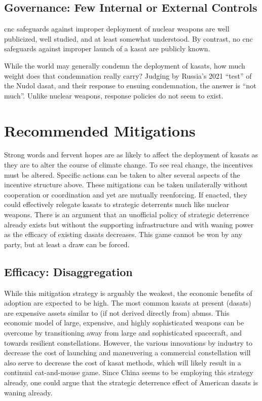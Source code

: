 \subsection*{Governance: Few Internal or External Controls}

\ac{cnc} safeguards against improper deployment of nuclear weapons are
well publicized, well studied, and at least somewhat
understood.\cite{nuke-matters-handbook} By contrast, no \ac{cnc}
safeguards against improper launch of a \ac{kasat} are publicly known.

While the world may generally condemn the deployment of \acp{kasat},
how much weight does that condemnation really carry?  Judging by
Russia's 2021 ``test'' of the Nudol \ac{dasat}, and their response to
ensuing condemnation, the answer is ``not much''.  Unlike nuclear
weapons, response policies do not seem to exist.


\section*{Recommended Mitigations}

Strong words and fervent hopes are as likely to affect the deployment
of \acp{kasat} as they are to alter the course of climate change.  To
see real change, the incentives must be altered.  Specific actions can
be taken to alter several aspects of the incentive structure above.
These mitigations can be taken unilaterally without cooperation or
coordination and yet are mutually reenforcing.  If enacted, they could
effectively relegate \acp{kasat} to strategic deterrents much like
nuclear weapons.  There is an argument that an unofficial policy of
strategic deterrence already exists\cite{war-no-more} but without the
supporting infrastructure and with waning power as the efficacy of
existing \acp{dasat} decreases.  This game cannot be won by any party,
but at least a draw can be forced.


\subsection*{Efficacy: Disaggregation}
While this mitigation strategy is arguably the weakest, the economic
benefits of adoption are expected to be high.  The most common
\acp{kasat} at present (\acp{dasat}) are expensive assets similar to
(if not derived directly from) \acp{abms}.\cite[pxiii]{brian} This
economic model of large, expensive, and highly sophisticated weapons
can be overcome by transitioning away from large and sophisticated
spacecraft, and towards resilient constellations.  However, the
various innovations by industry to decrease the cost of launching and
maneuvering a commercial constellation will also serve to decrease the
cost of \ac{kasat} methods, which will likely result in a continual
cat-and-mouse game.  Since China seems to be employing this strategy
already, one could argue that the strategic deterrence effect of
American \acp{dasat} is waning already.

